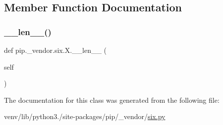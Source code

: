 \subsection{Member Function Documentation}
\mbox{\label{classpip_1_1__vendor_1_1six_1_1X_a866594d3db952940f101e7454b0ab76b}} 
\subsubsection{\texorpdfstring{\+\_\+\+\_\+len\+\_\+\+\_\+()}{\_\_len\_\_()}}
{\footnotesize\ttfamily def pip.\+\_\+vendor.\+six.\+X.\+\_\+\+\_\+len\+\_\+\+\_\+ (\begin{DoxyParamCaption}\item[{}]{self }\end{DoxyParamCaption})}



The documentation for this class was generated from the following file\+:\begin{DoxyCompactItemize}
\item 
venv/lib/python3./site-\/packages/pip/\+\_\+vendor/\hyperlink{pip_2__vendor_2six_8py}{six.\+py}\end{DoxyCompactItemize}
